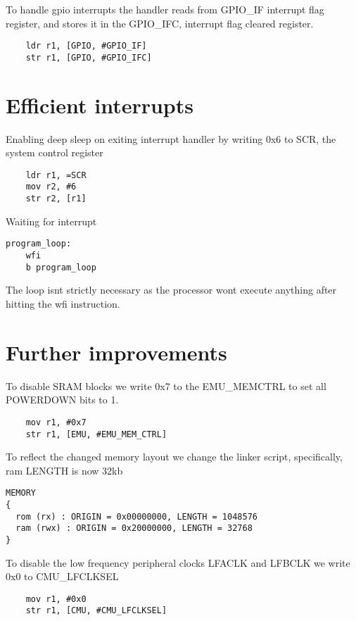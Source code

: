 To handle gpio interrupts the handler reads from GPIO\_IF interrupt flag register, and stores it in the GPIO\_IFC, interrupt flag cleared register.

\begin{lstlisting}
	ldr r1, [GPIO, #GPIO_IF]	
	str r1, [GPIO, #GPIO_IFC]	
\end{lstlisting}


\section{Efficient interrupts}

Enabling deep sleep on exiting interrupt handler by writing 0x6 to SCR, the system control register 

\begin{lstlisting}
	ldr r1, =SCR
	mov r2, #6
	str r2, [r1]	
\end{lstlisting}

Waiting for interrupt

\begin{lstlisting}
program_loop:
 	wfi
	b program_loop  	
\end{lstlisting}

The loop isnt strictly necessary as the processor wont execute anything after hitting the wfi instruction.

\section{Further improvements}

To disable SRAM blocks we write 0x7 to the EMU\_MEMCTRL to set all POWERDOWN bits to 1.

\begin{lstlisting}
	mov r1, #0x7
	str r1, [EMU, #EMU_MEM_CTRL]
\end{lstlisting}

To reflect the changed memory layout we change the linker script, specifically, ram LENGTH is now 32kb

\begin{lstlisting}
MEMORY
{
  rom (rx) : ORIGIN = 0x00000000, LENGTH = 1048576
  ram (rwx) : ORIGIN = 0x20000000, LENGTH = 32768
}
\end{lstlisting}

To disable the low frequency peripheral clocks LFACLK and LFBCLK we write 0x0 to CMU\_LFCLKSEL

\begin{lstlisting}
	mov r1, #0x0
	str r1, [CMU, #CMU_LFCLKSEL]
\end{lstlisting}
